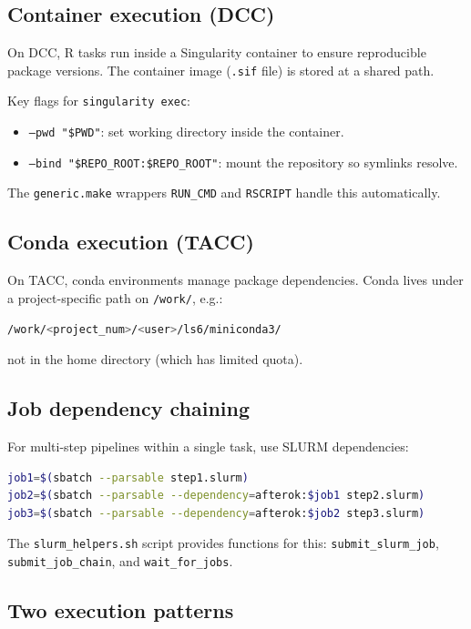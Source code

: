 \subsection{Container execution (DCC)}

On DCC, R tasks run inside a Singularity container to ensure reproducible package versions.
The container image (\texttt{.sif} file) is stored at a shared path.

Key flags for \texttt{singularity exec}:
\begin{itemize}
	\item \texttt{--pwd "\$PWD"}: set working directory inside the container.
	\item \texttt{--bind "\$REPO\_ROOT:\$REPO\_ROOT"}: mount the repository so symlinks resolve.
\end{itemize}

The \texttt{generic.make} wrappers \texttt{RUN\_CMD} and \texttt{RSCRIPT} handle this automatically.

\subsection{Conda execution (TACC)}

On TACC, conda environments manage package dependencies.
Conda lives under a project-specific path on \texttt{/work/}, e.g.:
\begin{lstlisting}[language=bash]
/work/<project_num>/<user>/ls6/miniconda3/
\end{lstlisting}
\noindent not in the home directory (which has limited quota).

\subsection{Job dependency chaining}

For multi-step pipelines within a single task, use SLURM dependencies:

\begin{lstlisting}[language=bash]
job1=$(sbatch --parsable step1.slurm)
job2=$(sbatch --parsable --dependency=afterok:$job1 step2.slurm)
job3=$(sbatch --parsable --dependency=afterok:$job2 step3.slurm)
\end{lstlisting}

The \texttt{slurm\_helpers.sh} script provides functions for this:
\texttt{submit\_slurm\_job}, \texttt{submit\_job\_chain},
and \texttt{wait\_for\_jobs}.

\subsection{Two execution patterns}

